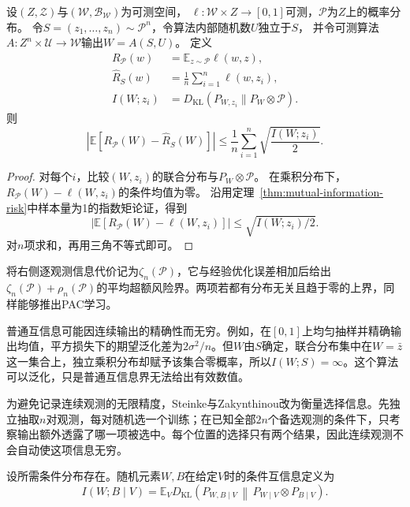 \begin{theorem}[逐观测互信息的期望风险界]
\label{thm:individual-information-risk}
设$(Z,\mathcal Z)$与$(\mathcal W,\mathcal B_{\mathcal W})$为可测空间，
$\ell:\mathcal W\times Z\to[0,1]$可测，$\mathcal P$为$Z$上的概率分布。
令$S=(z_1,\ldots,z_n)\sim\mathcal P^n$，令算法内部随机数$U$独立于$S$，
并令可测算法$A:Z^n\times\mathcal U\to\mathcal W$输出$W=A(S,U)$。
定义
\[
\begin{aligned}
 R_{\mathcal P}(w)
 &=\mathbb E_{z\sim\mathcal P}\ell(w,z),\\
 \hat R_S(w)
 &=\frac1n\sum_{i=1}^n\ell(w,z_i),\\
 I(W;z_i)
 &=D_{\mathrm{KL}}(P_{W,z_i}\|P_W\otimes\mathcal P).
\end{aligned}
\]
则
\[
 \left|\mathbb E[R_{\mathcal P}(W)-\hat R_S(W)]\right|
 \leq\frac1n\sum_{i=1}^n\sqrt{\frac{I(W;z_i)}2}.
\]
\end{theorem}
\begin{proof}
对每个$i$，比较$(W,z_i)$的联合分布与$P_W\otimes\mathcal P$。
在乘积分布下，$R_{\mathcal P}(W)-\ell(W,z_i)$的条件均值为零。
沿用定理~\ref{thm:mutual-information-risk}中样本量为1的指数矩论证，得到
\[
 \left|\mathbb E[R_{\mathcal P}(W)-\ell(W,z_i)]\right|
 \leq\sqrt{I(W;z_i)/2}.
\]
对$n$项求和，再用三角不等式即可。
\end{proof}

将右侧逐观测信息代价记为$\zeta_n(\mathcal P)$，它与经验优化误差相加后给出$\zeta_n(\mathcal P)+\rho_n(\mathcal P)$的平均超额风险界。两项若都有分布无关且趋于零的上界，同样能够推出PAC学习。

普通互信息可能因连续输出的精确性而无穷。例如，在$[0,1]$上均匀抽样并精确输出均值，平方损失下的期望泛化差为$2\sigma^2/n$。但$W$由$S$确定，联合分布集中在$W=\bar z$这一集合上，独立乘积分布却赋予该集合零概率，所以$I(W;S)=\infty$。这个算法可以泛化，只是普通互信息界无法给出有效数值。

为避免记录连续观测的无限精度，Steinke与Zakynthinou改为衡量选择信息。先独立抽取$n$对观测，每对随机选一个训练；在已知全部$2n$个备选观测的条件下，只考察输出额外透露了哪一项被选中。每个位置的选择只有两个结果，因此连续观测不会自动使这项信息无穷。

\begin{definition}[条件互信息]
\label{def:stability-conditional-information}
设所需条件分布存在。随机元素$W,B$在给定$V$时的条件互信息定义为
\[
 I(W;B\mid V)
 =\mathbb E_V D_{\mathrm{KL}}\!\left(
 P_{W,B\mid V}\,\middle\|\,P_{W\mid V}\otimes P_{B\mid V}\right).
\]
\end{definition}

